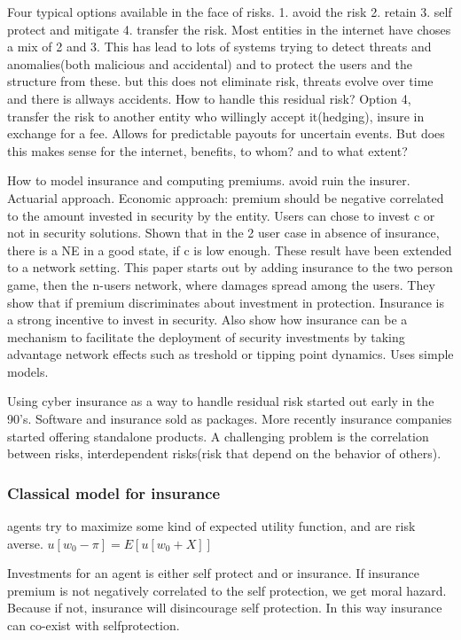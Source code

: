 Four typical options available in the face of risks. 
1. avoid the risk 2. retain 3. self protect and mitigate 4. transfer the risk.
Most entities in the internet have choses a mix of 2 and 3. This has lead to 
lots of systems trying to detect threats and anomalies(both malicious and accidental)
 and to protect the users and the structure from these.
but this does not eliminate risk, threats evolve over time and there is allways accidents.
How to handle this residual risk?
Option 4, transfer the risk to another entity who willingly accept it(hedging),
 insure in exchange for a fee. Allows for predictable payouts for uncertain events.
But does this makes sense for the internet, benefits, to whom? and to what extent?

How to model insurance and computing premiums. avoid ruin the insurer. Actuarial approach.
 Economic approach:  premium should be negative correlated to the amount
invested in security by the entity. Users can chose to invest c or not in security
solutions. Shown that in the 2 user case in absence of insurance, there is a NE
in a good state, if c is low enough. These result have been extended to a
network setting. This paper starts out by adding insurance to the two person game,
 then the n-users network, where damages spread among the users. 
 They show that if premium discriminates about investment in protection.
  Insurance is a strong incentive to invest in security.
   Also show how insurance can be a mechanism to facilitate the deployment of security
    investments by taking advantage network effects such as treshold or tipping point dynamics. 
    Uses simple models. 

Using cyber insurance as a way to handle residual risk started out early in the 90's. 
Software and insurance sold as packages. 
 More recently insurance companies started offering standalone products.
  A challenging problem is the correlation between risks, interdependent risks(risk that depend on the behavior of others).

\subsubsection{Classical model for insurance}
agents try to maximize some kind of expected utility function, and are risk averse.
$u[w_{0}-\pi]=E[u[w_{0}+X]]$

Investments for an agent is either self protect and or insurance.
If insurance premium is not negatively correlated to the self protection, we get moral hazard. Because if not, insurance will disincourage self protection.
In this way insurance can co-exist with selfprotection.


